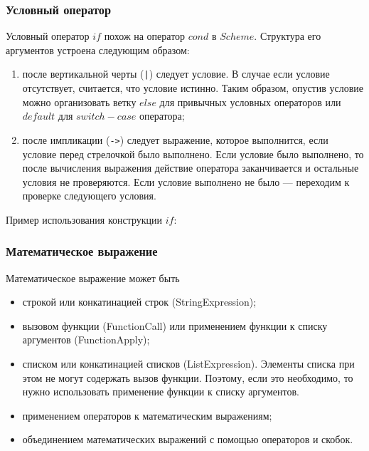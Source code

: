         \subsubsection{Условный оператор}
            Условный оператор $if$ похож на оператор $cond$ в $Scheme$.
            Структура его аргументов устроена следующим образом:
            \begin{enumerate}
                \item после вертикальной черты (\verb,|,) следует условие.
                    В случае если условие отсутствует, считается, что условие истинно.
                    Таким образом, опустив условие можно организовать ветку $else$ для привычных условных операторов
                    или $default$ для $switch-case$ оператора;
                \item после импликации (\verb,->,) следует выражение, которое выполнится, если условие перед стрелочкой было выполнено.
                    Если условие было выполнено, то после вычисления выражения действие оператора заканчивается и остальные условия не проверяются.
                    Если условие выполнено не было --- переходим к проверке следующего условия.
            \end{enumerate}

            

            Пример использования конструкции $if$:

            

        \subsubsection{Математическое выражение}
            Математическое выражение может быть
            \begin{itemize}
                \item строкой или конкатинацией строк (StringExpression);
                \item вызовом функции (FunctionCall) или применением функции к списку аргументов (FunctionApply);
                \item списком или конкатинацией списков (ListExpression).
                    Элементы списка при этом не могут содержать вызов функции.
                    Поэтому, если это необходимо, то нужно использовать применение функции к списку аргументов.
                \item применением операторов к математическим выражениям;
                \item объединением математических выражений с помощью операторов и скобок.
            \end{itemize}
            
